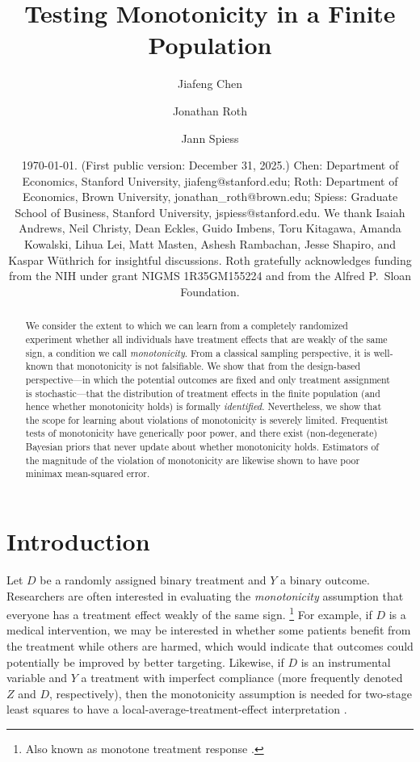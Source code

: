 \documentclass[12pt,reqno]{amsart}
\title{Testing Monotonicity in a Finite Population} %
\author{Jiafeng Chen \and Jonathan Roth \and Jann Spiess}
\date{\today. (First public version: December 31, 2025.) Chen: Department of Economics, Stanford University, jiafeng@stanford.edu; Roth: Department of Economics, Brown University, jonathan\_roth@brown.edu; Spiess: Graduate School of Business, Stanford University, jspiess@stanford.edu. We thank Isaiah Andrews, Neil Christy, Dean Eckles, Guido Imbens, Toru Kitagawa, Amanda Kowalski, Lihua Lei, Matt Masten, Ashesh Rambachan, Jesse Shapiro, and Kaspar Wüthrich for insightful discussions. Roth gratefully acknowledges funding from the NIH under grant NIGMS 1R35GM155224 and from the Alfred P.\ Sloan Foundation.}
\begin{document}
\maketitle

\begin{abstract}
We consider the extent to which we can learn from a completely randomized experiment
whether all individuals have treatment effects that are weakly of the same sign, a condition we
call \emph{monotonicity}. From a classical sampling perspective, it is well-known that monotonicity is not falsifiable. We show that from the design-based perspective—in which the potential outcomes are fixed and only treatment assignment is stochastic—that the distribution of treatment effects in the
finite population (and hence whether monotonicity holds) is formally \emph{identified}. Nevertheless, we show that the scope for learning about violations of monotonicity is severely limited. Frequentist tests of monotonicity have generically poor power, and there exist (non-degenerate) Bayesian priors that never update about whether monotonicity holds. Estimators of the magnitude of the violation of monotonicity are likewise shown to have poor minimax mean-squared error. 


\end{abstract}

\newpage 

\section{Introduction}

Let $D$ be a randomly assigned binary treatment and $Y$ a binary outcome. Researchers are
often interested in evaluating the \emph{monotonicity} assumption that everyone has a treatment effect weakly of the same sign.%
\footnote{Also known as monotone treatment response \citep{manski1997monotone}.}
For
example, if $D$ is a medical intervention, we may be interested in whether some patients benefit from the treatment while others are harmed, which would indicate that outcomes could potentially be improved by better targeting.
Likewise, if $D$ is an
instrumental variable and $Y$ a treatment with imperfect compliance (more frequently
denoted $Z$ and $D$, respectively), then the monotonicity assumption is needed for
two-stage least squares to have a local-average-treatment-effect interpretation
\citep{AngristImbens(94)}.
\end{document}
